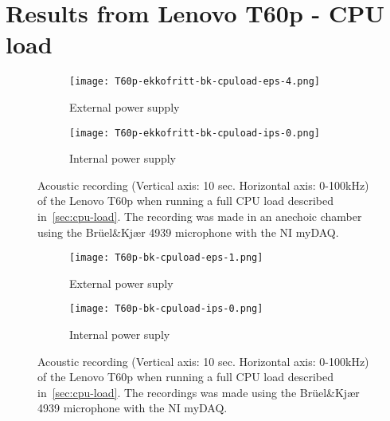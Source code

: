 \section{Results from Lenovo T60p - CPU load}\label{sec:t60p_results_cpuload}

\begin{wrapfigure}{r}{1\textwidth}
	\begin{subfigure}{1\textwidth}
	    \centering
	    \texttt{[image: T60p-ekkofritt-bk-cpuload-eps-4.png]}
	    \caption{External power supply}
	    \label{fig:T60p-ekkofritt-bk-cpuload-eps-4}
    \end{subfigure}
    \begin{subfigure}{1\textwidth}
	    \centering
	    \texttt{[image: T60p-ekkofritt-bk-cpuload-ips-0.png]}
	    \caption{Internal power supply}
	    \label{fig:T60p-ekkofritt-bk-cpuload-ips-0}
    \end{subfigure}
    \caption{Acoustic recording (Vertical axis: 10 sec. Horizontal axis: 0-100kHz) of the Lenovo T60p when running a full CPU load described in~\autoref{sec:cpu-load}. The recording was made in an anechoic chamber using the Brüel\&Kjær 4939 microphone with the NI myDAQ.}
	\label{fig:T60p-ekkofritt-bk-cpuload}
\end{wrapfigure}

\begin{wrapfigure}{r}{1\textwidth}
	\begin{subfigure}{1\textwidth}
	    \centering
	    \texttt{[image: T60p-bk-cpuload-eps-1.png]}
	    \caption{External power suply}
	    \label{fig:T60p-bk-cpuload-eps-1-1a}
    \end{subfigure}
    \begin{subfigure}{1\textwidth}
	    \centering
	    \texttt{[image: T60p-bk-cpuload-ips-0.png]}
	    \caption{Internal power suply}
	    \label{fig:T60p-bk-cpuload-ips-0-1b}
    \end{subfigure}
    \caption{Acoustic recording (Vertical axis: 10 sec. Horizontal axis: 0-100kHz) of the Lenovo T60p when running a full CPU load described in~\autoref{sec:cpu-load}. The recordings was made using the Brüel\&Kjær 4939 microphone with the NI myDAQ. }
	\label{fig:T60p-bk-cpuload}
\end{wrapfigure}


